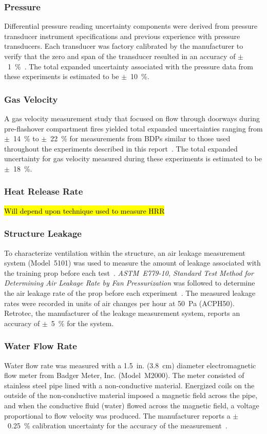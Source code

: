 \documentclass[12pt,oneside]{book}
\begin{document}
\subsubsection*{Pressure}
Differential pressure reading uncertainty components were derived from pressure transducer instrument specifications and previous experience with pressure transducers. Each transducer was factory calibrated by the manufacturer to verify that the zero and span of the transducer resulted in an accuracy of $\pm$~1~\%~\cite{Setra:2002}. The total expanded uncertainty associated with the pressure data from these experiments is estimated to be $\pm$~10~\%.

\subsubsection*{Gas Velocity}
A gas velocity measurement study that focused on flow through doorways during pre-flashover compartment fires yielded total expanded uncertainties ranging from $\pm$~14~\% to $\pm$~22~\% for measurements from BDPs similar to those used throughout the experiments described in this report~\cite{Bryant:FSJ2009}. The total expanded uncertainty for gas velocity measured during these experiments is estimated to be $\pm$~18~\%.

\subsubsection*{Heat Release Rate}
\hl{Will depend upon technique used to measure HRR}

\subsubsection*{Structure Leakage} 
To characterize ventilation within the structure, an air leakage measurement system (Model~5101) was used to measure the amount of leakage associated with the training prop before each test~\cite{retrotec:leakage}. \textit{ASTM~E779-10, Standard Test Method for Determining Air Leakage Rate by Fan Pressurization} was followed to determine the air leakage rate of the prop before each experiment~\cite{astm_e779}. The measured leakage rates were recorded in units of air changes per hour at 50~Pa (ACPH50). Retrotec, the manufacturer of the leakage measurement system, reports an accuracy of $\pm$~5~\% for the system.

\subsubsection*{Water Flow Rate}
Water flow rate was measured with a 1.5~in. (3.8~cm) diameter electromagnetic flow meter from Badger Meter, Inc. (Model~M2000). The meter consisted of stainless steel pipe lined with a non-conductive material. Energized coils on the outside of the non-conductive material imposed a magnetic field across the pipe, and when the conductive fluid (water) flowed across the magnetic field, a voltage proportional to flow velocity was produced. The manufacturer reports a $\pm$~0.25~\% calibration uncertainty for the accuracy of the measurement~\cite{Badger:2015}.
\end{document}
